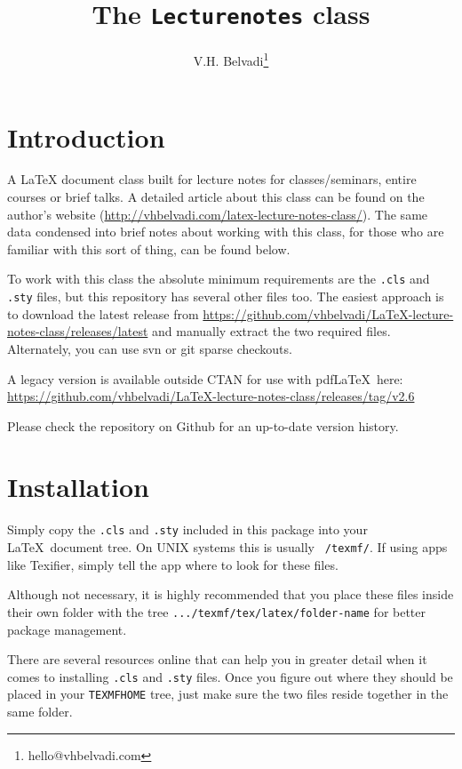 \documentclass[a4paper,margin=1in]{article}
\title{The \texttt{Lecturenotes} class}
\author{V.H. Belvadi\thanks{hello@vhbelvadi.com}}
\begin{document}
\maketitle
\tableofcontents

\section{Introduction}

A LaTeX document class built for lecture notes for classes/seminars, entire courses or brief talks. A detailed article about this class can be found on the author's website (\url{http://vhbelvadi.com/latex-lecture-notes-class/}). The same data condensed into brief notes about working with this class, for those who are familiar with this sort of thing, can be found below.

To work with this class the absolute minimum requirements are the \texttt{.cls} and \texttt{.sty} files, but this repository has several other files too. The easiest approach is to download the latest release from \url{https://github.com/vhbelvadi/LaTeX-lecture-notes-class/releases/latest} and manually extract the two required files. Alternately, you can use svn or git sparse checkouts.

A legacy version is available outside CTAN for use with pdf\LaTeX\ here: \url{https://github.com/vhbelvadi/LaTeX-lecture-notes-class/releases/tag/v2.6}

Please check the repository on Github for an up-to-date version history.

\section{Installation}

Simply copy the \texttt{.cls} and \texttt{.sty} included in this package into your \LaTeX\ document tree. On UNIX systems this is usually \texttt{~/texmf/}. If using apps like Texifier, simply tell the app where to look for these files.

Although not necessary, it is highly recommended that you place these files inside their own folder with the tree \texttt{.../texmf/tex/latex/folder-name} for better package management.

There are several resources online that can help you in greater detail when it comes to installing \texttt{.cls} and \texttt{.sty} files. Once you figure out where they should be placed in your \texttt{TEXMFHOME} tree, just make sure the two files reside together in the same folder.
\end{document}
